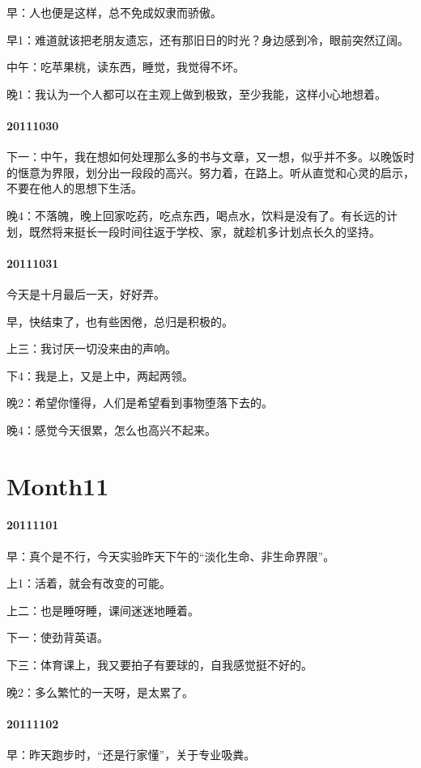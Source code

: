 \documentclass[UTF8]{book}
\begin{document}
早：人也便是这样，总不免成奴隶而骄傲。

早1：难道就该把老朋友遗忘，还有那旧日的时光？身边感到冷，眼前突然辽阔。

中午：吃苹果桃，读东西，睡觉，我觉得不坏。

晚1：我认为一个人都可以在主观上做到极致，至少我能，这样小心地想着。

\paragraph{20111030}
下一：中午，我在想如何处理那么多的书与文章，又一想，似乎并不多。以晚饭时的惬意为界限，划分出一段段的高兴。努力着，在路上。听从直觉和心灵的启示，不要在他人的思想下生活。

晚4：不落魄，晚上回家吃药，吃点东西，喝点水，饮料是没有了。有长远的计划，既然将来挺长一段时间往返于学校、家，就趁机多计划点长久的坚持。

\paragraph{20111031}
今天是十月最后一天，好好弄。

早，快结束了，也有些困倦，总归是积极的。

上三：我讨厌一切没来由的声响。

下4：我是上，又是上中，两起两领。

晚2：希望你懂得，人们是希望看到事物堕落下去的。

晚4：感觉今天很累，怎么也高兴不起来。


\section{Month11}

\paragraph{20111101}
早：真个是不行，今天实验昨天下午的“淡化生命、非生命界限”。

上1：活着，就会有改变的可能。

上二：也是睡呀睡，课间迷迷地睡着。

下一：使劲背英语。

下三：体育课上，我又要拍子有要球的，自我感觉挺不好的。

晚2：多么繁忙的一天呀，是太累了。


\paragraph{20111102}
早：昨天跑步时，“还是行家懂”，关于专业吸粪。
\end{document}
